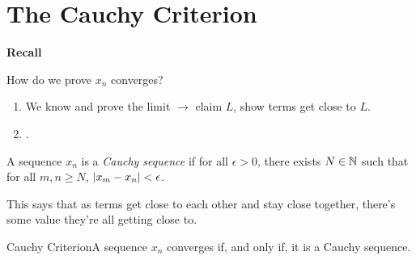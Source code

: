 \section{The Cauchy Criterion}

\begin{center}
    \textbf{Recall}
\end{center}
How do we prove \(x_n\) converges?
\begin{enumerate}
    \item We know and prove the limit \(\rightarrow\) claim \(L\), show terms get close to \(L\).
    \item {}.
\end{enumerate}

\begin{definition}
    A sequence \(x_n\) is a \textit{Cauchy sequence} if for all \(\epsilon > 0\), there exists \(N \in \mathbb{N}\) such that for all \(m,n \geq N\), \(\left|x_m - x_n\right| < \epsilon\).
\end{definition}

This says that as terms get close to each other and stay close together, there's some value they're all getting close to.

\begin{ntheorem}
    {Cauchy Criterion}A sequence \(x_n\) converges if, and only if, it is a Cauchy sequence.
\end{ntheorem}


